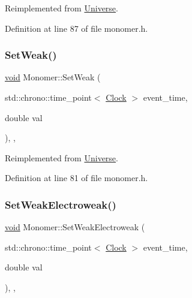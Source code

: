 Reimplemented from \mbox{\hyperlink{class_universe_a1b2d6197ddf3d613cc30bd04d22ed8b7}{Universe}}.



Definition at line 87 of file monomer.\+h.

\mbox{\label{class_monomer_ad4fe1db33f493575281e1a2fb35004ca}} 
\subsubsection{\texorpdfstring{Set\+Weak()}{SetWeak()}}
{\footnotesize\ttfamily \mbox{\hyperlink{glad_8h_a950fc91edb4504f62f1c577bf4727c29}{void}} Monomer\+::\+Set\+Weak (\begin{DoxyParamCaption}\item[{std\+::chrono\+::time\+\_\+point$<$ \mbox{\hyperlink{universe_8h_a0ef8d951d1ca5ab3cfaf7ab4c7a6fd80}{Clock}} $>$}]{event\+\_\+time,  }\item[{double}]{val }\end{DoxyParamCaption})\hspace{0.3cm}{\ttfamily [inline]}, {\ttfamily [final]}, {\ttfamily [virtual]}}



Reimplemented from \mbox{\hyperlink{class_universe_a0f5cd04081b41ee931c0557dc397f6fb}{Universe}}.



Definition at line 81 of file monomer.\+h.

\mbox{\label{class_monomer_ab887d7cfd2ecb557efb3ace59852019c}} 
\subsubsection{\texorpdfstring{Set\+Weak\+Electroweak()}{SetWeakElectroweak()}}
{\footnotesize\ttfamily \mbox{\hyperlink{glad_8h_a950fc91edb4504f62f1c577bf4727c29}{void}} Monomer\+::\+Set\+Weak\+Electroweak (\begin{DoxyParamCaption}\item[{std\+::chrono\+::time\+\_\+point$<$ \mbox{\hyperlink{universe_8h_a0ef8d951d1ca5ab3cfaf7ab4c7a6fd80}{Clock}} $>$}]{event\+\_\+time,  }\item[{double}]{val }\end{DoxyParamCaption})\hspace{0.3cm}{\ttfamily [inline]}, {\ttfamily [final]}, {\ttfamily [virtual]}}



